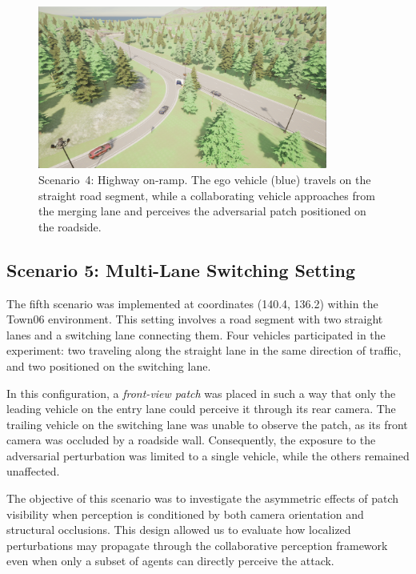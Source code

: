 \begin{figure}[H]
    \centering
    \includegraphics[width=0.85\textwidth]{figures/experiments/scenario4_v1.png}
    \caption{Scenario~4: Highway on-ramp. The ego vehicle (blue) travels on the 
    straight road segment, while a collaborating vehicle approaches from the 
    merging lane and perceives the adversarial patch positioned on the roadside.}
    \label{fig:scenario4_onramp}
\end{figure}

\subsection{Scenario 5: Multi-Lane Switching Setting}

The fifth scenario was implemented at coordinates (140.4, 136.2) within the 
Town06 environment. This setting involves a road segment with two straight 
lanes and a switching lane connecting them. Four vehicles participated in the 
experiment: two traveling along the straight lane in the same direction of 
traffic, and two positioned on the switching lane.  

In this configuration, a \textit{front-view patch} was placed in such a way that 
only the leading vehicle on the entry lane could perceive it through its rear camera. The trailing vehicle on the switching lane was unable to 
observe the patch, as its front camera was occluded by a roadside wall.  
Consequently, the exposure to the adversarial perturbation was limited to 
a single vehicle, while the others remained unaffected.  

The objective of this scenario was to investigate the asymmetric effects of 
patch visibility when perception is conditioned by both camera orientation 
and structural occlusions. This design allowed us to evaluate how localized 
perturbations may propagate through the collaborative perception framework 
even when only a subset of agents can directly perceive the attack.  

